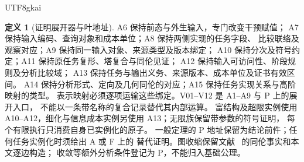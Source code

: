 \documentclass[12pt]{report}
\theoremstyle{definition}
\newtheorem{definition}{定义}[chapter]
\begin{document}
\begin{CJK*}{UTF8}{gkai}
\begin{definition}[证明展开器与叶地址]
A6 保持前态与外生输入，专门改变干预赋值；
A7 保持输入编码、查询对象和成本单位；A8 保持两侧实现的任务字段、
比较联络及观察对应；A9 保持同一输入对象、来源类型及版本绑定；
A10 保持分次及符号约定；A11 保持原任务复形、塔复合与同伦见证；
A12 保持输入可访问性、阶段规则及分析比较域；
A13 保持任务与输出义务、来源版本、成本单位及证书有效区间。
A14 保持分析形式、定向及几何同伦的对应；A15 保持任务实现关系与高阶映射的类型。
表示映射必须逐项运输这些绑定。V01--V12 是 A1--A9 与 P 上的展开入口，
不能以一条带名称的复合记录替代其内部运算。
富结构及超限实例使用 A10--A12，细化与信息成本实例另使用 A13；无限族保留带参数的符号证明，
每个有限执行只消费自身已实例化的原子。
一般定理的 P 地址保留为结论前件；任何任务实例化时须给出 A 或 F 上的
替代证明。图收缩保留文献~\cite{hatcher} 的同伦事实和本文逐边构造；
收敛等额外分析条件登记为 P，不能归入基础公理。
\end{definition}


\end{CJK*}
\end{document}
